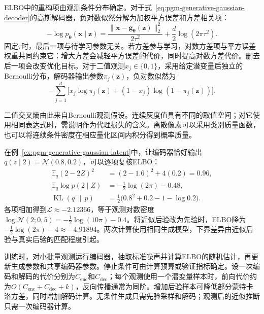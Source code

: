 ELBO中的重构项由观测条件分布确定。对于式~\eqref{eq:pgm-generative-gaussian-decoder}的高斯解码器，负对数似然分解为加权平方误差和方差相关项：
\begin{equation}
  \label{eq:pgm-generative-reconstruction}
  -\log p_{\bm{\theta}}(\bm{x}\mid\bm{z})
  =\frac{\lVert\bm{x}-\bm{g}_{\bm{\theta}}(\bm{z})\rVert_2^2}
          {2\tau^2}
    +\frac{d}{2}\log(2\pi\tau^2).
\end{equation}
固定$\tau$时，最后一项与待学习参数无关。若方差参与学习，对数方差项与平方误差权重共同约束它：增大方差会减轻平方误差的代价，同时提高对数方差代价。删去后一项会改变优化目标。对于二值观测$x_j\in\{0,1\}$，采用给定潜变量后独立的Bernoulli分布，解码器输出参数$\pi_j(\bm{z})$，负对数似然为
\[
  -\sum_{j=1}^{d}
    \bigl[x_j\log\pi_j(\bm{z})
      +(1-x_j)\log(1-\pi_j(\bm{z}))\bigr].
\]

二值交叉熵由此来自Bernoulli观测假设。连续灰度值具有不同的取值空间；对它使用相同表达式时，需说明作为代理损失的含义。离散像素可以采用类别质量函数，也可以将连续条件密度在相应量化区间内积分得到概率质量。

在例~\ref{ex:pgm-generative-gaussian-latent}中，让编码器恰好输出$q(z\mid2)=\mathcal{N}(0.8,0.2)$，可以逐项复核ELBO：
\[
  \begin{aligned}
    \mathbb{E}_{q}(2-2Z)^2&=(2-1.6)^2+4(0.2)=0.96,\\
    \mathbb{E}_{q}\log p(2\mid Z)&=-\tfrac12\log(2\pi)-0.48,\\
    \operatorname{KL}(q\,\|\,p)&=
       \tfrac12\bigl(0.8^2+0.2-1-\log0.2\bigr).
  \end{aligned}
\]
各项相加得到$\mathcal{L}\approx-2.12366$，等于观测对数密度$\log\mathcal{N}(2;0,5)=-\tfrac12\log(10\pi)-0.4$。将近似后验改为先验时，ELBO降为$-\tfrac12\log(2\pi)-4\approx-4.91894$。两次计算使用相同生成模型，下界差异由近似后验与真实后验的匹配程度引起。

训练时，对小批量观测运行编码器，抽取标准噪声并计算ELBO的随机估计，再更新生成参数和共享编码器参数。停止条件可由计算预算或验证指标确定。设一次编码和解码的代价分别为$C_{\mathrm{enc}}$和$C_{\mathrm{dec}}$；每个观测使用一个潜变量样本时，前向代价约为$O(C_{\mathrm{enc}}+C_{\mathrm{dec}}+k)$，反向传播通常为同阶。增加后验样本可降低部分蒙特卡洛方差，同时增加解码计算。无条件生成只需先验采样和解码；观测后的近似推断只需一次编码器计算。

